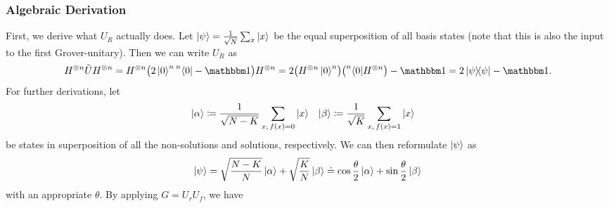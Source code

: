 			\subsubsection{Algebraic Derivation}
				First, we derive what \(U_R\) actually does. Let \( \ket{\psi} = \frac{1}{\sqrt{N}} \sum_x \ket{x} \) be the equal superposition of all basis states (note that this is also the input to the first Grover-unitary). Then we can write \(U_R\) as
				\begin{equation}
					H^{\otimes n} \tilde{U} H^{\otimes n}
						= H^{\otimes n} \bigl( 2 \ket{0}^n\prescript{n}{}{\bra{0}} - \ID \bigr) H^{\otimes n}
						= 2 \bigl( H^{\otimes n} \ket{0}^n \bigr) \bigl( \prescript{n}{}{\bra{0}} H^{\otimes n} \bigr) - \ID
						= 2 \ketbra{\psi}{\psi} - \ID.
				\end{equation}
				For further derivations, let
				\begin{align}
					\ket{\alpha} &\coloneqq \frac{1}{\sqrt{N - K}} \sum_{x,\, f(x) = 0} \ket{x} &
					\ket{\beta} &\coloneqq \frac{1}{\sqrt{K}} \sum_{x,\, f(x) = 1} \ket{x}
				\end{align}
				be states in superposition of all the non-solutions and solutions, respectively. We can then reformulate \(\ket{\psi}\) as
				\begin{equation}
					\ket{\psi}
						= \sqrt{\frac{N - K}{N}} \ket{\alpha} + \sqrt{\frac{K}{N}} \ket{\beta}
						\doteq \cos\frac{\theta}{2} \ket{\alpha} + \sin\frac{\theta}{2} \ket{\beta}
				\end{equation}
				with an appropriate \(\theta\). By applying \( G = U_r U_f \), we have
